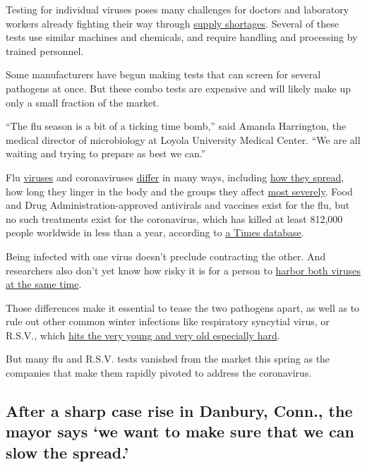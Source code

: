 Testing for individual viruses poses many challenges for doctors and
laboratory workers already fighting their way through
\href{https://www.nytimes3xbfgragh.onion/2020/08/04/us/virus-testing-delays.html}{supply
shortages}. Several of these tests use similar machines and chemicals,
and require handling and processing by trained personnel.

Some manufacturers have begun making tests that can screen for several
pathogens at once. But these combo tests are expensive and will likely
make up only a small fraction of the market.

``The flu season is a bit of a ticking time bomb,'' said Amanda
Harrington, the medical director of microbiology at Loyola University
Medical Center. ``We are all waiting and trying to prepare as best we
can.''

Flu
\href{https://www.nytimes3xbfgragh.onion/2020/07/14/health/flu-aerosols-coronavirus.html}{viruses}
and coronaviruses
\href{https://www.cdc.gov/flu/symptoms/flu-vs-covid19.htm}{differ} in
many ways, including
\href{https://www.nytimes3xbfgragh.onion/2020/08/07/health/coronavirus-superspreading-contagion.html}{how
they spread}, how long they linger in the body and the groups they
affect
\href{https://www.nytimes3xbfgragh.onion/2020/08/04/health/coronavirus-immune-system.html}{most
severely}. Food and Drug Administration-approved antivirals and vaccines
exist for the flu, but no such treatments exist for the coronavirus,
which has killed at least 812,000 people worldwide in less than a year,
according to
\href{https://www.nytimes3xbfgragh.onion/interactive/2020/world/coronavirus-maps.html}{a
Times database}.

Being infected with one virus doesn't preclude contracting the other.
And researchers also don't yet know how risky it is for a person to
\href{https://www.thelancet.com/journals/lancet/article/PIIS0140-6736(20)31052-7/fulltext}{harbor
both viruses at the same time}.

Those differences make it essential to tease the two pathogens apart, as
well as to rule out other common winter infections like respiratory
syncytial virus, or R.S.V., which
\href{https://www.cdc.gov/rsv/high-risk/index.html}{hits the very young
and very old especially hard}.

But many flu and R.S.V. tests vanished from the market this spring as
the companies that make them rapidly pivoted to address the coronavirus.

\hypertarget{after-a-sharp-case-rise-in-danbury-conn-the-mayor-says-we-want-to-make-sure-that-we-can-slow-the-spread}{%
\subsection{After a sharp case rise in Danbury, Conn., the mayor says
`we want to make sure that we can slow the
spread.'}\label{after-a-sharp-case-rise-in-danbury-conn-the-mayor-says-we-want-to-make-sure-that-we-can-slow-the-spread}}

